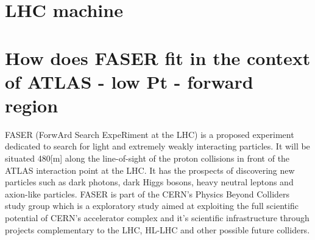 \nomenclature[g-p]{$\pi$}{ $\simeq 3.14\ldots$}                                             %



\section{LHC machine} %





\section{How does FASER fit in the context of ATLAS - low Pt - forward region}  %
\label{section1.3}

FASER (ForwArd Search ExpeRiment at the LHC) is a proposed experiment dedicated to search for light and extremely weakly interacting particles. It will be situated 480[m] along the line-of-sight of the proton collisions in front of the ATLAS interaction point at the LHC. It has the prospects of discovering new particles such as dark photons, dark Higgs bosons, heavy neutral leptons and axion-like particles. FASER is part of the CERN's Physics Beyond Colliders study group which is a exploratory study aimed at exploiting the full scientific potential of CERN's accelerator complex and it's scientific infrastructure through projects complementary to the LHC, HL-LHC and other possible future colliders.

